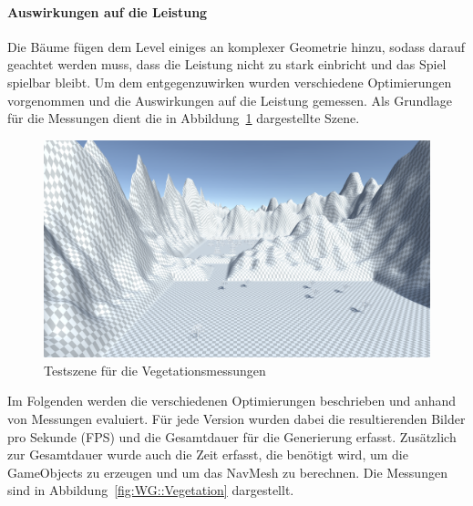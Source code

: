 \paragraph*{Auswirkungen auf die Leistung}
Die Bäume fügen dem Level einiges an komplexer Geometrie hinzu, sodass darauf geachtet werden muss, dass die Leistung nicht zu stark einbricht und das Spiel spielbar bleibt.
Um dem entgegenzuwirken wurden verschiedene Optimierungen vorgenommen und die Auswirkungen auf die Leistung gemessen.
Als Grundlage für die Messungen dient die in Abbildung~\ref{fig:Vegetationscene} dargestellte Szene.
\begin{figure}[ht]
    \centering
    \includegraphics[width=.9\linewidth]{chapters/05_Technische_Umsetzung/03_World_Generation/Performance/fpsperfscr.png}
    \caption{Testszene für die Vegetationsmessungen}\label{fig:Vegetationscene}
\end{figure}

Im Folgenden werden die verschiedenen Optimierungen beschrieben und anhand von Messungen evaluiert.
Für jede Version wurden dabei die resultierenden Bilder pro Sekunde (FPS) und die Gesamtdauer für die Generierung erfasst.
Zusätzlich zur Gesamtdauer wurde auch die Zeit erfasst, die benötigt wird, um die GameObjects zu erzeugen und um das NavMesh zu berechnen.
Die Messungen sind in Abbildung~\ref{fig:WG::Vegetation} dargestellt.

